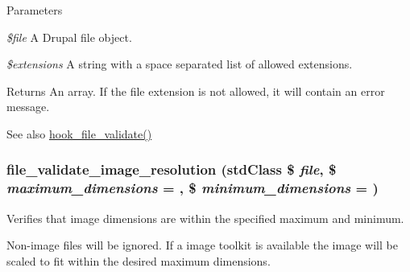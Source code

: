 \begin{DoxyParams}{Parameters}
\item[{\em \$file}]A Drupal file object. \item[{\em \$extensions}]A string with a space separated list of allowed extensions.\end{DoxyParams}
\begin{DoxyReturn}{Returns}
An array. If the file extension is not allowed, it will contain an error message.
\end{DoxyReturn}
\begin{DoxySeeAlso}{See also}
\hyperlink{group__hooks_gab1491b52a117229913448d787156e013}{hook\_\-file\_\-validate()} 
\end{DoxySeeAlso}
\hypertarget{group__file_gaa90145fbf8065f644871c9d770e3cce4}{
\subsubsection[{file\_\-validate\_\-image\_\-resolution}]{\setlength{\rightskip}{0pt plus 5cm}file\_\-validate\_\-image\_\-resolution (stdClass \$ {\em file}, \/  \$ {\em maximum\_\-dimensions} = {}, \/  \$ {\em minimum\_\-dimensions} = {})}}
\label{group__file_gaa90145fbf8065f644871c9d770e3cce4}
Verifies that image dimensions are within the specified maximum and minimum.

Non-\/image files will be ignored. If a image toolkit is available the image will be scaled to fit within the desired maximum dimensions.


